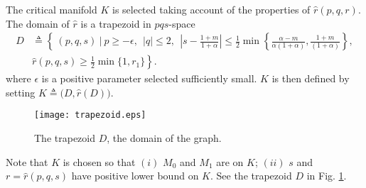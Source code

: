 \documentclass[11pt]{article}
\theoremstyle{remark}
\begin{document}
The critical manifold $K$ is selected taking account of the properties of $\hat{r}(p,q,r)$. The domain of $\hat{r}$ is a trapezoid in $pqs$-space
\begin{align*}
 D &\triangleq \left\{ \: (p,q,s) \: \Big| \:  p\ge-\epsilon, ~~ |q|\le2, ~~ \left|s-\frac{1+m}{1+\alpha}\right| \le \frac{1}{2}\min\left\{\frac{\alpha-m}{\alpha(1+\alpha)},\frac{1+m}{(1+\alpha)}\right\},\right.  \\
 &\left. \hat{r}(p,q,s)\ge \frac{1}{2}\min\{1,r_1\}\right\}.
\end{align*}
where  $\epsilon$ is a positive parameter selected sufficiently small.  $K$ is then defined by setting $K\triangleq\big(D,\hat{r}(D)\big)$.
\begin{figure}[ht]
 \centering
  \texttt{[image: trapezoid.eps]}
  \caption{The trapezoid $D$, the domain of the graph.} \label{fig:D}
\end{figure}
Note that $K$ is chosen so that $(i)$ $M_0$ and $M_1$ are on $K$; $(ii)$ $s$ and $r=\hat{r}(p,q,s)$ have positive lower bound on $K$. See the trapezoid $D$ in Fig. \ref{fig:D}.
\end{document}
